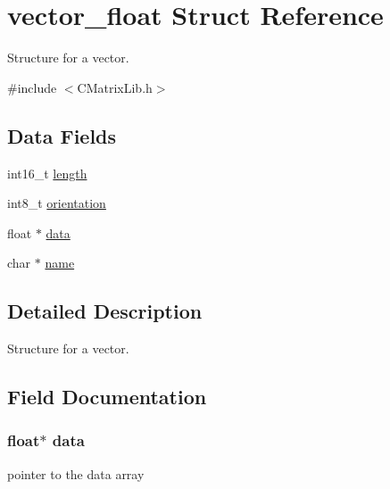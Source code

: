 \hypertarget{structvector__float}{}\section{vector\+\_\+float Struct Reference}
\label{structvector__float}


Structure for a vector.  




{\ttfamily \#include $<$C\+Matrix\+Lib.\+h$>$}

\subsection*{Data Fields}
\begin{DoxyCompactItemize}
\item 
int16\+\_\+t \hyperlink{structvector__float_a0ff9f63e333676ba1359f505d02dd281}{length}
\item 
int8\+\_\+t \hyperlink{structvector__float_a3b52d30800bf0fc116fe4cc73c54e1c8}{orientation}
\item 
float $\ast$ \hyperlink{structvector__float_a57ba9c584cf7756552b7d4370e93395f}{data}
\item 
char $\ast$ \hyperlink{structvector__float_a5ac083a645d964373f022d03df4849c8}{name}
\end{DoxyCompactItemize}


\subsection{Detailed Description}
Structure for a vector. 

\subsection{Field Documentation}
\hypertarget{structvector__float_a57ba9c584cf7756552b7d4370e93395f}{}
\subsubsection[{data}]{\setlength{\rightskip}{0pt plus 5cm}float$\ast$ data}\label{structvector__float_a57ba9c584cf7756552b7d4370e93395f}
pointer to the data array \hypertarget{structvector__float_a0ff9f63e333676ba1359f505d02dd281}{}
